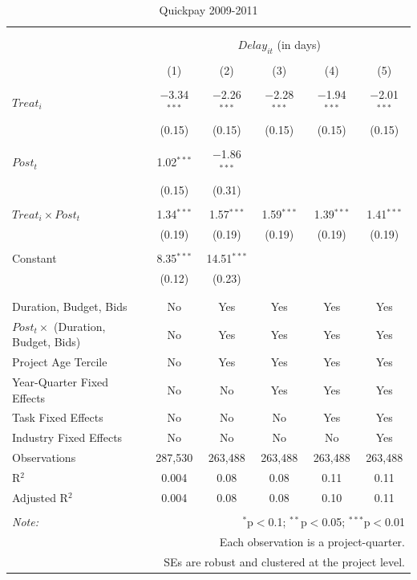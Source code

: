 \documentclass[
]{article}
\begin{document}
\begin{table}[H] \centering 
  \caption{Quickpay 2009-2011} 
  \label{} 
\small 
\begin{tabular}{@{\extracolsep{-2pt}}lccccc} 
\\[-1.8ex]\hline 
\hline \\[-1.8ex] 
\\[-1.8ex] & \multicolumn{5}{c}{$Delay_{it}$ (in days)} \\ 
\\[-1.8ex] & (1) & (2) & (3) & (4) & (5)\\ 
\hline \\[-1.8ex] 
 $Treat_i$ & $-$3.34$^{***}$ & $-$2.26$^{***}$ & $-$2.28$^{***}$ & $-$1.94$^{***}$ & $-$2.01$^{***}$ \\ 
  & (0.15) & (0.15) & (0.15) & (0.15) & (0.15) \\ 
  & & & & & \\ 
 $Post_t$ & 1.02$^{***}$ & $-$1.86$^{***}$ &  &  &  \\ 
  & (0.15) & (0.31) &  &  &  \\ 
  & & & & & \\ 
 $Treat_i \times Post_t$ & 1.34$^{***}$ & 1.57$^{***}$ & 1.59$^{***}$ & 1.39$^{***}$ & 1.41$^{***}$ \\ 
  & (0.19) & (0.19) & (0.19) & (0.19) & (0.19) \\ 
  & & & & & \\ 
 Constant & 8.35$^{***}$ & 14.51$^{***}$ &  &  &  \\ 
  & (0.12) & (0.23) &  &  &  \\ 
  & & & & & \\ 
\hline \\[-1.8ex] 
Duration, Budget, Bids & No & Yes & Yes & Yes & Yes \\ 
$Post_t \times$  (Duration, Budget, Bids) & No & Yes & Yes & Yes & Yes \\ 
Project Age Tercile & No & Yes & Yes & Yes & Yes \\ 
Year-Quarter Fixed Effects & No & No & Yes & Yes & Yes \\ 
Task Fixed Effects & No & No & No & Yes & Yes \\ 
Industry Fixed Effects & No & No & No & No & Yes \\ 
Observations & 287,530 & 263,488 & 263,488 & 263,488 & 263,488 \\ 
R$^{2}$ & 0.004 & 0.08 & 0.08 & 0.11 & 0.11 \\ 
Adjusted R$^{2}$ & 0.004 & 0.08 & 0.08 & 0.10 & 0.11 \\ 
\hline 
\hline \\[-1.8ex] 
\textit{Note:}  & \multicolumn{5}{r}{$^{*}$p$<$0.1; $^{**}$p$<$0.05; $^{***}$p$<$0.01} \\ 
 & \multicolumn{5}{r}{Each observation is a project-quarter.} \\ 
 & \multicolumn{5}{r}{SEs are robust and clustered at the project level.} \\ 
\end{tabular} 
\end{table}
\end{document}
